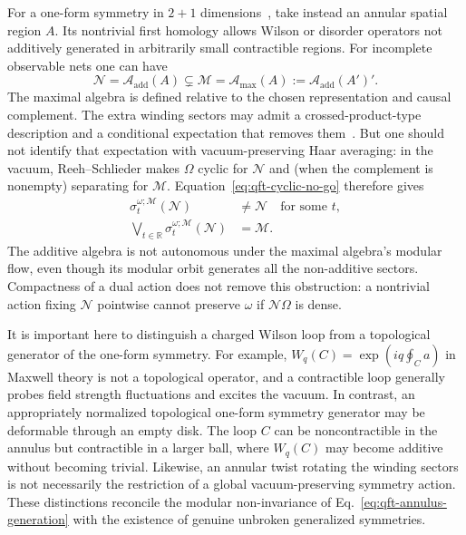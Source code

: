 \documentclass[a4paper,11pt]{article}
\theoremstyle{definition}
\begin{document}
For a one-form symmetry in $2+1$ dimensions~\cite{GaiottoKapustinSeibergWillett2015}, take instead an annular
spatial region $A$. Its nontrivial first homology allows Wilson or
disorder operators not additively generated in arbitrarily small
contractible regions. For incomplete observable nets one can have
\begin{equation}
 \mathcal N=\mathcal A_{\mathrm{add}}(A)
 \subsetneq\mathcal M=\mathcal A_{\mathrm{max}}(A)
 :=\mathcal A_{\mathrm{add}}(A')'.
 \label{eq:qft-additive-maximal}
\end{equation}
The maximal algebra is defined relative to the chosen representation
and causal complement. The extra winding sectors may admit a
crossed-product-type description and a conditional expectation that
removes them~\cite{GaiottoKapustinSeibergWillett2015,CasiniHuertaMaganPontello2021,CasiniMagan2021}.
But one should not identify that expectation with vacuum-preserving
Haar averaging: in the vacuum, Reeh--Schlieder makes $\Omega$ cyclic
for $\mathcal N$ and (when the complement is nonempty) separating
for $\mathcal M$. Equation~\eqref{eq:qft-cyclic-no-go} therefore gives
\begin{align}
 \sigma_t^{\omega;\mathcal M}(\mathcal N)&\neq\mathcal N
 \quad\text{for some }t,\nonumber\\
 \bigvee_{t\in\mathbb R}
 \sigma_t^{\omega;\mathcal M}(\mathcal N)&=\mathcal M .
 \label{eq:qft-annulus-generation}
\end{align}
The additive algebra is not autonomous under the maximal algebra's
modular flow, even though its modular orbit generates all the
non-additive sectors. Compactness of a dual action does not remove this
obstruction: a nontrivial action fixing $\mathcal N$ pointwise cannot
preserve $\omega$ if $\mathcal N\Omega$ is dense.

It is important here to distinguish a charged Wilson loop from a
topological generator of the one-form symmetry. For example, $W_q(C)=\exp(iq\oint_C a)$ in Maxwell theory is not
a topological operator, and a contractible loop generally probes field
strength fluctuations and excites the vacuum. In contrast, an
appropriately normalized topological one-form symmetry generator may
be deformable through an empty disk. The loop $C$ can be
noncontractible in the annulus but contractible in a larger ball, where
$W_q(C)$ may become additive without becoming trivial.
Likewise, an annular twist rotating the winding sectors is not
necessarily the restriction of a global vacuum-preserving symmetry
action. These distinctions reconcile the modular non-invariance of
Eq.~\eqref{eq:qft-annulus-generation} with the existence of genuine
unbroken generalized symmetries.
\end{document}
